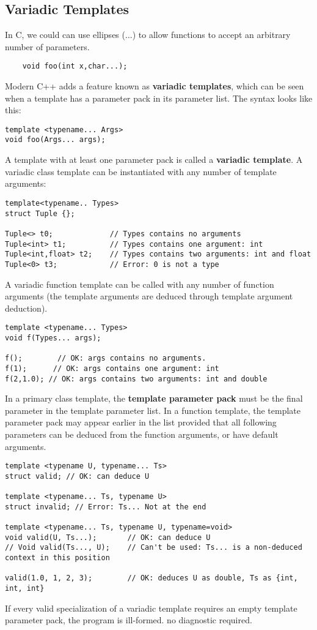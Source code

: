\documentclass{report}
\begin{document}
\subsection{Variadic Templates}
In C, we could can use ellipses ($\ldots$) to allow functions to accept an arbitrary number of parameters.
\begin{verbatim}
    void foo(int x,char...);
\end{verbatim}
Modern C++ adds a feature known as \textbf{variadic templates}, which can be seen when a template has a parameter pack in its parameter list. The syntax looks like this:
\begin{verbatim}
template <typename... Args>
void foo(Args... args);
\end{verbatim}
A template with at least one parameter pack is called a \textbf{variadic template}.
\bigbreak \noindent
A variadic class template can be instantiated with any number of template arguments:
\begin{verbatim}
template<typename.. Types>
struct Tuple {};

Tuple<> t0;             // Types contains no arguments
Tuple<int> t1;          // Types contains one argument: int
Tuple<int,float> t2;    // Types contains two arguments: int and float
Tuple<0> t3;            // Error: 0 is not a type
\end{verbatim}
\bigbreak \noindent
A variadic function template can be called with any number of function arguments (the template arguments are deduced through template argument deduction).
\begin{verbatim}
template <typename... Types>
void f(Types... args);

f();        // OK: args contains no arguments.
f(1);      // OK: args contains one argument: int
f(2,1.0); // OK: args contains two arguments: int and double
\end{verbatim}
In a primary class template, the \textbf{template parameter pack} must be the final parameter in the template parameter list. In a function template, the template parameter pack may appear earlier in the list provided that all following parameters can be deduced from the function arguments, or have default arguments.
\begin{verbatim}
template <typename U, typename... Ts>
struct valid; // OK: can deduce U

template <typename... Ts, typename U>
struct invalid; // Error: Ts... Not at the end

template <typename... Ts, typename U, typename=void>
void valid(U, Ts...);       // OK: can deduce U
// Void valid(Ts..., U);    // Can't be used: Ts... is a non-deduced context in this position

valid(1.0, 1, 2, 3);        // OK: deduces U as double, Ts as {int, int, int}
\end{verbatim}
If every valid specialization of a variadic template requires an empty template parameter pack, the program is ill-formed. no diagnostic required.
\end{document}
